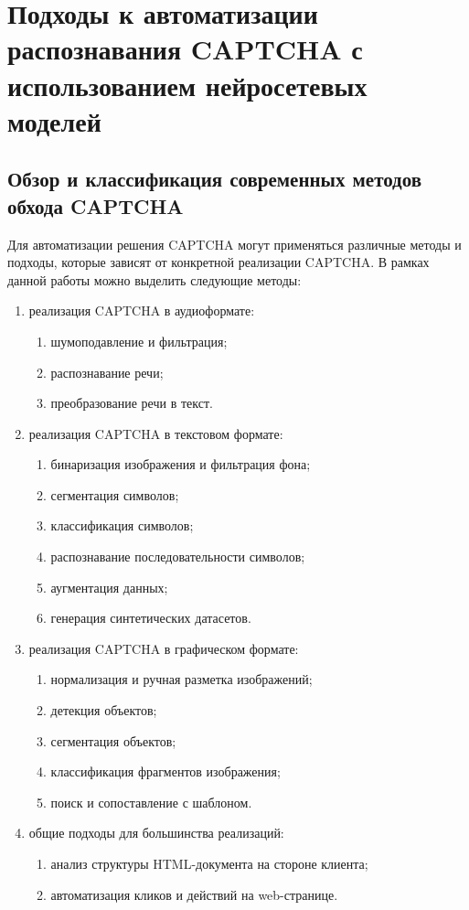 \chapter{Подходы к автоматизации распознавания CAPTCHA с использованием нейросетевых моделей}

\section{Обзор и классификация современных методов обхода CAPTCHA}

Для автоматизации решения CAPTCHA могут применяться различные методы и подходы, 
которые зависят от конкретной реализации CAPTCHA. В рамках данной работы можно 
выделить следующие методы:

\begin{enumerate}
    \item реализация CAPTCHA в аудиоформате:
    \begin{enumerate}
        \item шумоподавление и фильтрация;
        \item распознавание речи;
        \item преобразование речи в текст.
    \end{enumerate}
    \item реализация CAPTCHA в текстовом формате:
    \begin{enumerate}
        \item бинаризация изображения и фильтрация фона;
        \item сегментация символов;
        \item классификация символов;
        \item распознавание последовательности символов;
        \item аугментация данных;
        \item генерация синтетических датасетов.
    \end{enumerate}
    \item реализация CAPTCHA в графическом формате:
    \begin{enumerate}
        \item нормализация и ручная разметка изображений;
        \item детекция объектов;
        \item сегментация объектов;
        \item классификация фрагментов изображения;
        \item поиск и сопоставление с шаблоном. 
    \end{enumerate}
    \item общие подходы для большинства реализаций:
    \begin{enumerate}
        \item анализ структуры HTML-документа на стороне клиента;
        \item автоматизация кликов и действий на web-странице.
    \end{enumerate}
\end{enumerate}

